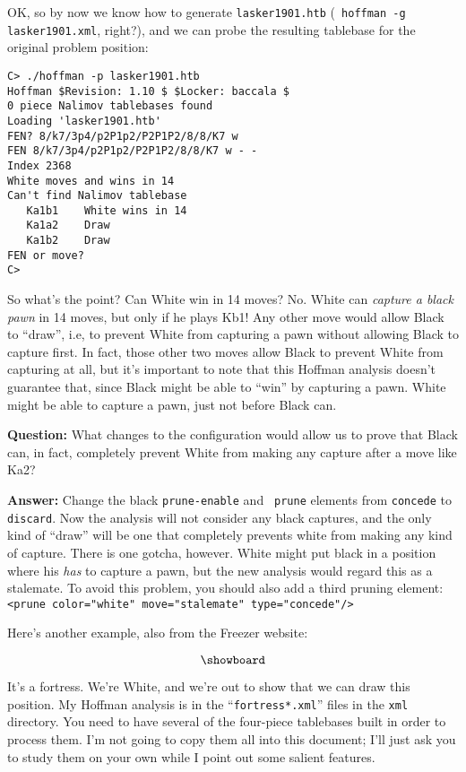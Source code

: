 \documentclass[11pt]{article}
\begin{document}
OK, so by now we know how to generate {\tt lasker1901.htb} ({\tt
hoffman -g lasker1901.xml}, right?), and we can probe the resulting
tablebase for the original problem position:

\begin{verbatim}
C> ./hoffman -p lasker1901.htb
Hoffman $Revision: 1.10 $ $Locker: baccala $
0 piece Nalimov tablebases found
Loading 'lasker1901.htb'
FEN? 8/k7/3p4/p2P1p2/P2P1P2/8/8/K7 w
FEN 8/k7/3p4/p2P1p2/P2P1P2/8/8/K7 w - -
Index 2368
White moves and wins in 14
Can't find Nalimov tablebase
   Ka1b1    White wins in 14
   Ka1a2    Draw
   Ka1b2    Draw
FEN or move?
C>
\end{verbatim}

So what's the point?  Can White win in 14 moves?  No.  White can {\it
capture a black pawn} in 14 moves, but only if he plays Kb1!  Any
other move would allow Black to ``draw'', i.e, to prevent White from
capturing a pawn without allowing Black to capture first.  In fact,
those other two moves allow Black to prevent White from capturing at
all, but it's important to note that this Hoffman analysis doesn't
guarantee that, since Black might be able to ``win'' by capturing a
pawn.  White might be able to capture a pawn, just not before Black
can.

{\bf Question:} What changes to the configuration would allow us to
prove that Black can, in fact, completely prevent White from making
any capture after a move like Ka2?

{\bf Answer:} Change the black {\tt prune-enable} and {\tt
prune} elements from {\tt concede} to {\tt discard}.  Now the analysis
will not consider any black captures, and the only kind of ``draw''
will be one that completely prevents white from making any kind of
capture.  There is one gotcha, however.  White might put black in a
position where his {\it has} to capture a pawn, but the new analysis
would regard this as a stalemate.  To avoid this problem, you should
also add a third pruning element: {\tt <prune color="white"
move="stalemate" type="concede"/>}

Here's another example, also from the Freezer website:

$$\showboard$$

It's a fortress.  We're White, and we're out to show that we can draw
this position.  My Hoffman analysis is in the ``{\tt fortress*.xml}''
files in the {\tt xml} directory.  You need to have several of
the four-piece tablebases built in order to process them.  I'm not
going to copy them all into this document; I'll just ask you to study
them on your own while I point out some salient features.
\end{document}
